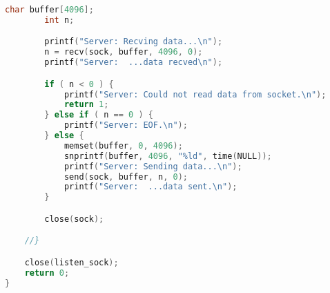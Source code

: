 \documentclass[a4paper]{article}
\begin{document}
\begin{lstlisting}[caption=Mit TCP: Server,language=C]
        char buffer[4096];
        int n;

        printf("Server: Recving data...\n");
        n = recv(sock, buffer, 4096, 0);
        printf("Server:  ...data recved\n");

        if ( n < 0 ) {
            printf("Server: Could not read data from socket.\n");
            return 1;
        } else if ( n == 0 ) {
            printf("Server: EOF.\n");
        } else {
            memset(buffer, 0, 4096);
            snprintf(buffer, 4096, "%ld", time(NULL));
            printf("Server: Sending data...\n");
            send(sock, buffer, n, 0);
            printf("Server:  ...data sent.\n");
        }

        close(sock);

    //}

    close(listen_sock);
    return 0;
}

\end{lstlisting}
\end{document}
